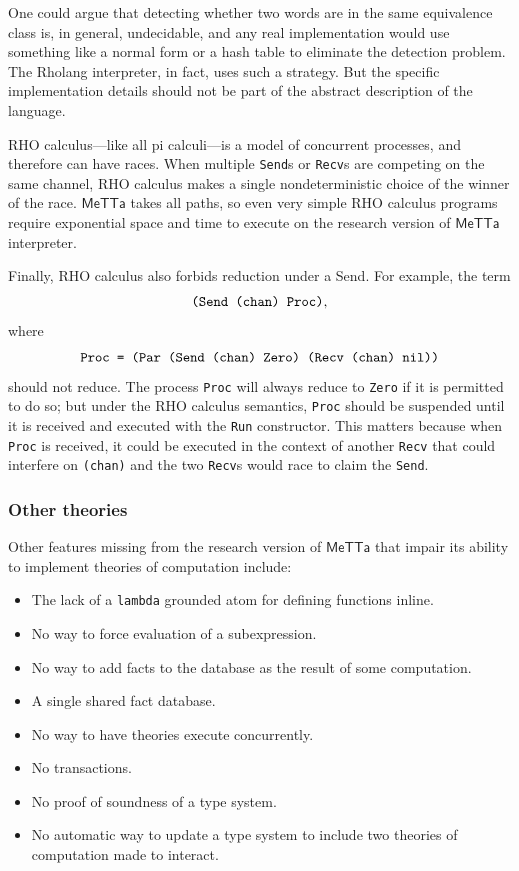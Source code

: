 \documentclass{article}
\begin{document}
One could argue that detecting whether two words are in the same
equivalence class is, in general, undecidable, and any real
implementation would use something like a normal form or a hash table
to eliminate the detection problem.  The Rholang interpreter, in fact,
uses such a strategy.  But the specific implementation details should
not be part of the abstract description of the language.

RHO calculus---like all pi calculi---is a model of concurrent
processes, and therefore can have races.  When multiple \verb+Send+s
or \verb+Recv+s are competing on the same channel, RHO calculus makes
a single nondeterministic choice of the winner of the race.
$\mathsf{MeTTa}$ takes all paths, so even very simple RHO calculus
programs require exponential space and time to execute on the research
version of $\mathsf{MeTTa}$ interpreter.

Finally, RHO calculus also forbids reduction under a Send.  For example, the term 
\[\mbox{\tt(Send (chan) Proc)},\]
where
\[\mbox{\tt Proc = (Par (Send (chan) Zero) (Recv (chan) nil))}\]
should not reduce.  The process \verb+Proc+ will always reduce to \verb+Zero+ if it is permitted to do so; but under the RHO calculus semantics, \verb+Proc+ should be suspended until it is received and executed with the \verb+Run+ constructor.  This matters because when \verb+Proc+ is received, it could be executed in the context of another \verb+Recv+ that could interfere on \verb+(chan)+ and the two \verb+Recv+s would race to claim the \verb+Send+.

\subsubsection{Other theories}

Other features missing from the research version of $\mathsf{MeTTa}$ that impair its ability to implement theories of computation include:
\begin{itemize}
    \item The lack of a \verb+lambda+ grounded atom for defining functions inline.
    \item No way to force evaluation of a subexpression.
    \item No way to add facts to the database as the result of some computation.
    \item A single shared fact database.
    \item No way to have theories execute concurrently.
    \item No transactions.
    \item No proof of soundness of a type system.
    \item No automatic way to update a type system to include two theories of computation made to interact.
\end{itemize}
\end{document}
